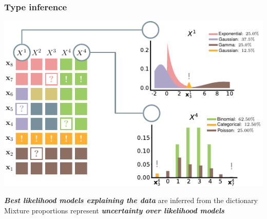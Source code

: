 \documentclass[xcolor={usenames,dvipsnames,svgnames}, compress, aspectratio=169, 11pt]{beamer}
\begin{document}
\begin{frame}[t, htt=bgrey2]
  \frametitle{Type inference}

  \large
  \begin{minipage}[t]{0.5\linewidth}
    \includegraphics[width=1.25\linewidth]{figures/abda-type-inf}
  \end{minipage}\hfill\begin{minipage}[t]{0.3\linewidth}
    \raggedright
    \vspace{-150pt}
    \emph{\textbf{Best likelihood models explaining the data}} are inferred from the
    dictionary\\[10pt]

    Mixture proportions represent \emph{\textbf{uncertainty over likelihood models}}\\[10pt]

    
  \end{minipage}  
\end{frame}
\end{document}
